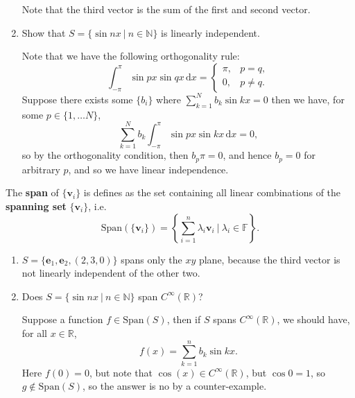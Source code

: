 \documentclass[letter-paper]{tufte-book}
\newenvironment{example}[1][Example]{\begin{trivlist}
\item[\hskip \labelsep {\bfseries #1}]}{\end{trivlist}}
\newcommand{\eb}{{\boldsymbol{e}}}
\newcommand{\vb}{{\boldsymbol{v}}}
\begin{document}
\begin{example}
\begin{enumerate}
    Note that the third vector is the sum of the first and second vector.
    
    \item Show that $S=\{\sin nx\ |\ n\in\mathbb{N}\}$ is linearly
    independent.
    
    Note that we have the following orthogonality rule:
    \begin{equation*}
      \int_{-\pi}^{\pi} \sin px \sin qx\, \mathrm{d}x = \begin{cases}\pi, & p = q,\\0, & p\neq q.\end{cases}
    \end{equation*}
    Suppose there exists some $\{b_i\}$ where $\sum_{k=1}^N b_k\sin kx = 0$ then
    we have, for some $p\in \{1, \ldots N\}$,
    \begin{equation*}
      \sum_{k=1}^N b_k \int_{-\pi}^\pi \sin px \sin kx\, \mathrm{d}x = 0,
    \end{equation*}
    so by the orthogonality condition, then $b_p \pi = 0$, and hence $b_p=0$ for
    arbitrary $p$, and so we have linear independence.
  \end{enumerate}
\end{example}

The \textbf{span} of $\{\vb_i\}$ is defines as the set containing all linear
combinations of the \textbf{spanning set} $\{\vb_i\}$, i.e.
\begin{equation}
  \mbox{Span}(\{\vb_i\}) = \left\{ \sum_{i=1}^n \lambda_i \vb_i \ |\ \lambda_i \in \mathbb{F} \right\}.
\end{equation}

\begin{example}
  \begin{enumerate}
    \item $S = \{\eb_1, \eb_2, (2, 3, 0)\}$ spans only the $xy$ plane, because
    the third vector is not linearly independent of the other two.
    
    \item Does $S=\{\sin nx\ |\ n\in\mathbb{N}\}$ span $C^\infty(\mathbb{R})$?
    
    Suppose a function $f\in \mbox{Span}(S)$, then if $S$ spans
    $C^\infty(\mathbb{R})$, we should have, for all $x\in \mathbb{R}$,
    \begin{equation*}
      f(x) = \sum_{k=1}^n b_k \sin kx.
    \end{equation*}
    Here $f(0)=0$, but note that $\cos(x)\in C^\infty(\mathbb{R})$, but $\cos 0
    =1$, so $g\not\in \mbox{Span}(S)$, so the answer is no by a counter-example.
  \end{enumerate}
\end{example}
\end{document}
